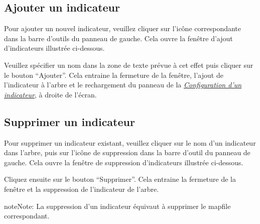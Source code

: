 \documentclass[letterpaper,10pt,french]{sphinxmanual}
\begin{document}
\subsection{Ajouter un indicateur}
\label{indicators/indicatorstree:ajouter-un-indicateur}
Pour ajouter un nouvel indicateur, veuillez cliquer sur l'icône correspondante dans la barre d'outils du panneau de gauche. Cela ouvre la fenêtre d'ajout d'indicateurs illustrée ci-dessous.


Veuillez spécifier un nom dans la zone de texte prévue à cet effet puis cliquer sur le bouton ``Ajouter''. Cela entraine la fermeture de la fenêtre, l'ajout de l'indicateur à l'arbre et le rechargement du panneau de la {\hyperref[indicators/indicatorspanel::doc]{\emph{\emph{Configuration d'un indicateur}}}}, à droite de l'écran.


\subsection{Supprimer un indicateur}
\label{indicators/indicatorstree:supprimer-un-indicateur}
Pour supprimer un indicateur existant, veuillez cliquer sur le nom d'un indicateur dans l'arbre, puis sur l'icône de suppression dans la barre d'outil du panneau de gauche. Cela ouvre la fenêtre de suppression d'indicateurs illustrée ci-dessous.


Cliquez ensuite sur le bouton ``Supprimer''. Cela entraine la fermeture de la fenêtre et la suppression de l'indicateur de l'arbre.

\begin{notice}{note}{Note:}
La suppression d'un indicateur équivaut à supprimer le mapfile correspondant.
\end{notice}
\end{document}
